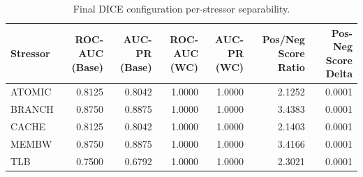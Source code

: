 \begin{table}[t]
\centering
\caption{Final DICE configuration per-stressor separability.}
\label{tab:dice_full_stressor}
\footnotesize
\begin{tabular}{lrrrrrr}
\toprule
Stressor & ROC-AUC (Base) & AUC-PR (Base) & ROC-AUC (WC) & AUC-PR (WC) & Pos/Neg Score Ratio & Pos-Neg Score Delta \\
\midrule
ATOMIC & 0.8125 & 0.8042 & 1.0000 & 1.0000 & 2.1252 & 0.0001 \\
BRANCH & 0.8750 & 0.8875 & 1.0000 & 1.0000 & 3.4383 & 0.0001 \\
CACHE & 0.8125 & 0.8042 & 1.0000 & 1.0000 & 2.1403 & 0.0001 \\
MEMBW & 0.8750 & 0.8875 & 1.0000 & 1.0000 & 3.4166 & 0.0001 \\
TLB & 0.7500 & 0.6792 & 1.0000 & 1.0000 & 2.3021 & 0.0001 \\
\bottomrule
\end{tabular}

\end{table}
